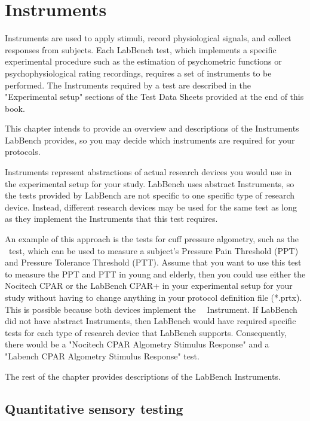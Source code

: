 \chapter{Instruments}
\label{ch:Instruments}

Instruments are used to apply stimuli, record physiological signals, and collect responses from subjects. Each LabBench test, which implements a specific experimental procedure such as the estimation of psychometric functions or psychophysiological rating recordings, requires a set of instruments to be performed. The Instruments required by a test are described in the "Experimental setup" sections of the Test Data Sheets provided at the end of this book.

This chapter intends to provide an overview and descriptions of the Instruments LabBench provides, so you may decide which instruments are required for your protocols.

Instruments represent abstractions of actual research devices you would use in the experimental setup for your study. LabBench uses abstract Instruments, so the tests provided by LabBench are not specific to one specific type of research device. Instead, different research devices may be used for the same test as long as they implement the Instruments that this test requires. 

An example of this approach is the tests for cuff pressure algometry, such as the ~ ~test, which can be used to measure a subject's Pressure Pain Threshold (PPT) and Pressure Tolerance Threshold (PTT). Assume that you want to use this test to measure the PPT and PTT in young and elderly, then you could use either the Nocitech CPAR or the LabBench CPAR+ in your experimental setup for your study without having to change anything in your protocol definition file (*.prtx). This is possible because both devices implement the~  ~Instrument. If LabBench did not have abstract Instruments, then LabBench would have required specific tests for each type of research device that LabBench supports. Consequently, there would be a "Nocitech CPAR Algometry Stimulus Response" and a "Labench CPAR Algometry Stimulus Response" test.

The rest of the chapter provides descriptions of the LabBench Instruments.

\section{Quantitative sensory testing}

